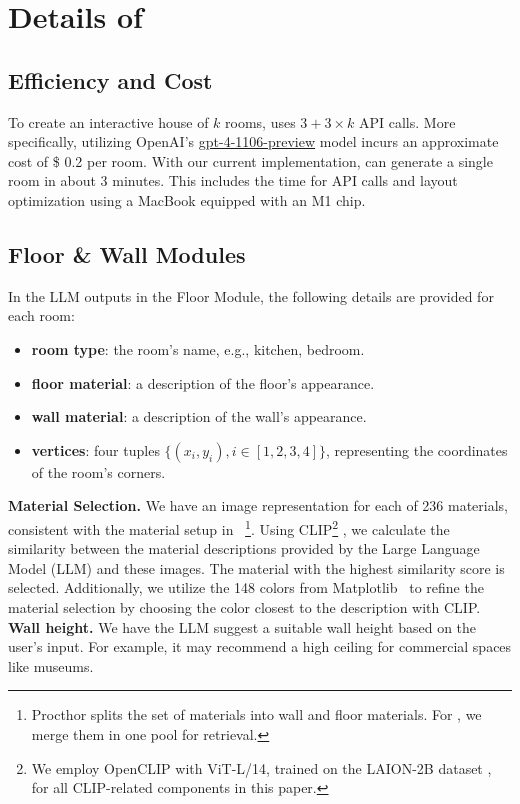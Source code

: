 \clearpage
\appendix
\section{Details of \holodeck} \label{appendix: holodeck details}

\subsection{Efficiency and Cost}
To create an interactive house of $k$ rooms, \holodeck uses $3 + 3 \times k$ API calls. More specifically, utilizing OpenAI's \href{https://platform.openai.com/docs/models/gpt-4-and-gpt-4-turbo}{gpt-4-1106-preview} model incurs an approximate cost of \$ 0.2 per room. With our current implementation, \holodeck can generate a single room in about 3 minutes. This includes the time for API calls and layout optimization using a MacBook equipped with an M1 chip.

\subsection{Floor \& Wall Modules}
In the LLM outputs in the Floor Module, the following details are provided for each room:
\begin{itemize}
    \item \textbf{room type}: the room's name,  e.g., kitchen, bedroom.
    \item \textbf{floor material}: a description of the floor's appearance.
    \item \textbf{wall material}: a description of the wall's appearance.
    \item \textbf{vertices}: four tuples $\{(x_i, y_i), i \in [1, 2, 3, 4]\}$, representing the coordinates of the room's corners.
\end{itemize}
\noindent \textbf{Material Selection.}  We have an image representation for each of 236 materials, consistent with the material setup in \procthor~\cite{procthor}\footnote{Procthor splits the set of materials into wall and floor materials. For \holodeck, we merge them in one pool for retrieval.}. Using CLIP\footnote{We employ OpenCLIP \cite{ilharco_gabriel_2021_5143773} with ViT-L/14, trained on the LAION-2B dataset \cite{schuhmann2022laionb}, for all CLIP-related components in this paper.} \cite{radford2021learning}, we calculate the similarity between the material descriptions provided by the Large Language Model (LLM) and these images. The material with the highest similarity score is selected. Additionally, we utilize the 148 colors from Matplotlib~\cite{Hunter:2007} to refine the material selection by choosing the color closest to the description with CLIP.
\smallbreak
\noindent \textbf{Wall height.} We have the LLM suggest a suitable wall height based on the user's input. For example, it may recommend a high ceiling for commercial spaces like museums.

